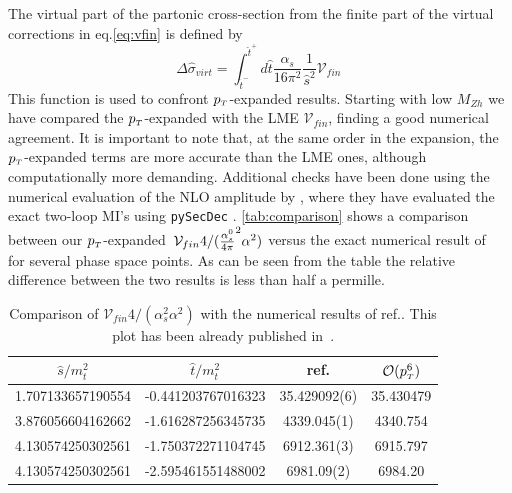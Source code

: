 The virtual part of the partonic cross-section
from the finite part of the virtual corrections in eq.\eqref{eq:vfin} is defined  by
\begin{equation}
	\Delta \hat{\sigma}_{virt}=
	\int_{\hat{t}^-}^{\hat{t}^+} d\hat{t}
	\frac{\alpha_s}{16\pi^2}\frac{1}{\hat{s}^2}\mathcal{V}_{fin}\,
	\label{eq:deltasigma}
\end{equation}
This function is used to confront $p_{\scriptscriptstyle T}$-expanded results. Starting with low $M_{Zh}$ we have compared the $p_{\scriptscriptstyle T}$-expanded with the LME 	$\mathcal{V}_{fin}$, finding a  good numerical agreement.
It is important to note that, at the same order in the expansion, 
the $p_{\scriptscriptstyle T}$-expanded terms are more accurate than
the LME ones, although computationally more demanding.  Additional checks have been done using the numerical evaluation of the NLO amplitude by \cite{Chen:2020gae}, where they have evaluated the exact two-loop MI's using \texttt{pySecDec}
\cite{Borowka:2017idc,Borowka:2018goh}.  \autoref{tab:comparison} shows a comparison between our $p_{\scriptscriptstyle T}$-expanded~$\mathcal{V}_{fin} 4/(\frac{\alpha_s^0}{4 \pi}^2 \alpha^2)$ versus the exact numerical result of ~\cite{Chen:2020gae} for several phase space points. 
As can be seen from the table the relative difference 
between the two results is less than half a permille.
\begin{table}
	\renewcommand{\arraystretch}{1.2}
	\centering
	\begin{tabular}{| c| c | c | c| } \hline
		\rowcolor{lightgray}  $\hat{s}/m_t^2$ & $\hat{t}/m_t^2$ &  ref.\cite{Chen:2020gae} & $\mathcal{O}(p_{\scriptscriptstyle T}^6)$  \\ \hline 
		\cellcolor{lightgray} 1.707133657190554 & \cellcolor{lightgray} -0.441203767016323 & 35.429092(6) & 35.430479 \\
		\cellcolor{lightgray} 3.876056604162662 & \cellcolor{lightgray} -1.616287256345735 & 4339.045(1) & 4340.754 \\
		\cellcolor{lightgray} 4.130574250302561 & \cellcolor{lightgray} -1.750372271104745 & 6912.361(3) & 6915.797 \\
		\cellcolor{lightgray} 4.130574250302561 & \cellcolor{lightgray} -2.595461551488002 & 6981.09(2) & 6984.20  \\ \hline
	\end{tabular}
	\caption{Comparison of $\mathcal{V}_{fin} 4/(\alpha_s^2 \alpha^2)$ with the numerical results of ref.\cite{Chen:2020gae}. This plot has been already published in~\cite{Alasfar:2021ppe}. \label{tab:comparison}}
\end{table}
